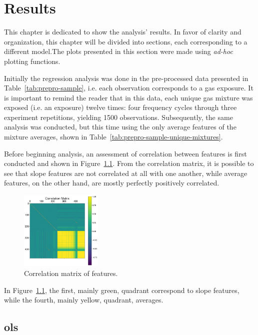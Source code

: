 \chapter{Results}
\label{cha:results}

This chapter is dedicated to show the analysis' results. In favor of clarity and organization, this chapter will be divided into sections, each corresponding to a different model.The plots presented in this section were made using \textit{ad-hoc} plotting functions.

Initially the regression analysis was done in the pre-processed data presented in Table~\ref{tab:prepro-sample}, i.e. each observation corresponds to a gas exposure. It is important to remind the reader that in this data, each unique gas mixture was exposed (i.e. an exposure) twelve times: four frequency cycles through three experiment repetitions, yielding 1500 observations. Subsequently, the same analysis was conducted, but this time using the only average features of the mixture averages, shown in Table~\ref{tab:prepro-sample-unique-mixtures}.

Before beginning analysis, an assessment of correlation between features is first conducted and shown in Figure~\ref{fig:cor-mat}. From the correlation matrix, it is possible to see that slope features are not correlated at all with one another, while average features, on the other hand, are mostly perfectly positively correlated.

\begin{figure}[h]
	\centering
	\includegraphics[width=0.35\textwidth]{../figures/correlation-matrix.png}
	\caption{Correlation matrix of features.}
	
	\label{fig:cor-mat}
\end{figure}

In Figure~\ref{fig:cor-mat}, the first, mainly green, quadrant correspond to slope features, while the fourth, mainly yellow, quadrant, averages.

\section{\acrlong{ols}}
\label{sec:results-ols}

